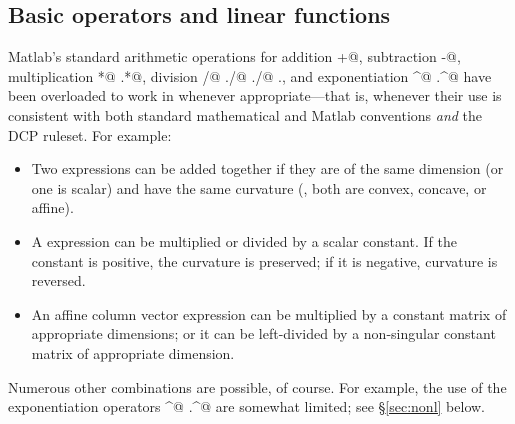 \documentclass[12pt]{article}
\begin{document}
\subsection{Basic operators and linear functions}

Matlab's standard arithmetic operations for
addition \verb@+@, subtraction \verb@-@, multiplication
\verb@*@ \verb@.*@, division \verb@/@ \verb@\@ \verb@./@
\verb@./@ \verb@.\@, and exponentiation \verb@^@ \verb@.^@
have been overloaded to work in \cvx whenever appropriate---that
is, whenever their use is consistent with both standard mathematical
and Matlab conventions \emph{and} the DCP ruleset.
For example:
\begin{itemize}
\item Two \cvx expressions can be added together if they are of the same
      dimension (or one is scalar) and have the same curvature (\ie, 
      both are convex, concave, or affine).
\item A \cvx expression can be multiplied or divided by a scalar constant. If the
      constant is positive, the curvature is preserved; if it is negative,
      curvature is reversed.      
\item An affine column vector \cvx expression can be multiplied by a constant matrix
      of appropriate dimensions; or it can be left-divided by a non-singular 
      constant matrix of appropriate dimension.
\end{itemize}
Numerous other combinations are possible, of course.
For example, the use of the exponentiation operators \verb@^@
\verb@.^@ are somewhat limited; see \S\ref{sec:nonl} below.
\end{document}
